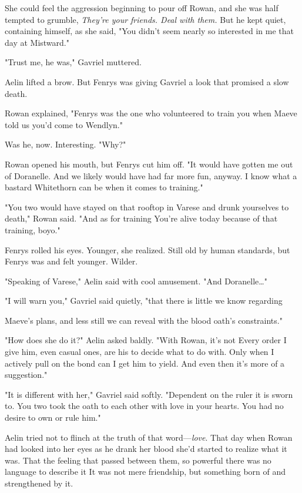 She could feel the aggression beginning to pour off Rowan, and she was half tempted to grumble, \emph{They're your friends. Deal with them.}
But he kept quiet, containing himself, as she said, "You didn't seem nearly so interested in me that day at Mistward."

"Trust me, he was," Gavriel muttered.

Aelin lifted a brow. But Fenrys was giving Gavriel a look that promised a slow death.

Rowan explained, "Fenrys was the one who  volunteered to train you when Maeve told us you'd come to Wendlyn."

Was he, now. Interesting. "Why?"

Rowan opened his mouth, but Fenrys cut him off. "It would have gotten me out of Doranelle. And we likely would have had far more fun, anyway. I know what a bastard Whitethorn can be when it comes to training."

"You two would have stayed on that rooftop in Varese and drunk yourselves to death," Rowan said. "And as for training  You're alive today because of that training, boyo."

Fenrys rolled his eyes. Younger, she realized. Still old by human standards, but Fenrys was and felt younger. Wilder.

"Speaking of Varese," Aelin said with cool amusement. "And Doranelle\ldots"

"I will warn you," Gavriel said quietly, "that there is little we know regarding

Maeve's plans, and less still we can reveal with the blood oath's constraints."

"How does she do it?" Aelin asked baldly. "With Rowan, it's not
 Every order I give him, even casual ones, are his to decide what to do with. Only when I actively pull on the bond can I get him to
 yield. And even then it's more of a suggestion."

"It is different with her," Gavriel said softly. "Dependent on the ruler it is sworn to. You two took the oath to each other with love in your hearts. You had no desire to own or rule him."

Aelin tried not to flinch at the truth of that word---\emph{love}. That day  when Rowan had looked into her eyes as he drank her blood
 she'd started to realize what it was. That the feeling that passed between them, so powerful there was no language to describe it
 It was not mere friendship, but something born of and strengthened by it.

